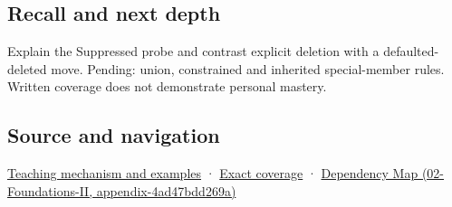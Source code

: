 \subsection{Recall and next depth}\label{appendix-42e02a12c694-recall-and-next-depth}

Explain the Suppressed probe and contrast explicit deletion with a defaulted-deleted move. Pending: union, constrained and inherited special-member rules. Written coverage does not demonstrate personal mastery.

\subsection{Source and navigation}\label{appendix-42e02a12c694-source-and-navigation}

\hyperref[01-foundations-i-ch003-let-the-compiler-compose-the-operations]{Teaching mechanism and examples} · \hyperref[appendix-fd090d982a15-m009---parts-127-147]{Exact coverage} · \href{../02-Foundations-II/main.pdf\#nameddest=appendix-4ad47bdd269a}{Dependency Map (02-Foundations-II, appendix-4ad47bdd269a)}
